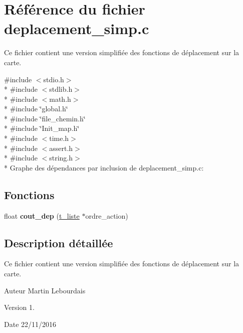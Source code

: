 \hypertarget{a00012}{}\section{Référence du fichier deplacement\+\_\+simp.\+c}
\label{a00012}


Ce fichier contient une version simplifiée des fonctions de déplacement sur la carte.  


{\ttfamily \#include $<$stdio.\+h$>$}\\*
{\ttfamily \#include $<$stdlib.\+h$>$}\\*
{\ttfamily \#include $<$math.\+h$>$}\\*
{\ttfamily \#include \char`\"{}global.\+h\char`\"{}}\\*
{\ttfamily \#include \char`\"{}file\+\_\+chemin.\+h\char`\"{}}\\*
{\ttfamily \#include \char`\"{}Init\+\_\+map.\+h\char`\"{}}\\*
{\ttfamily \#include $<$time.\+h$>$}\\*
{\ttfamily \#include $<$assert.\+h$>$}\\*
{\ttfamily \#include $<$string.\+h$>$}\\*
Graphe des dépendances par inclusion de deplacement\+\_\+simp.\+c\+:
\subsection*{Fonctions}
\begin{DoxyCompactItemize}
\item 
float {\bfseries cout\+\_\+dep} (\hyperlink{a00005}{t\+\_\+liste} $\ast$ordre\+\_\+action)\hypertarget{a00012_a7e0b3c478cc356928424d9b66c9154c4}{}\label{a00012_a7e0b3c478cc356928424d9b66c9154c4}

\end{DoxyCompactItemize}


\subsection{Description détaillée}
Ce fichier contient une version simplifiée des fonctions de déplacement sur la carte. 

\begin{DoxyAuthor}{Auteur}
Martin Lebourdais 
\end{DoxyAuthor}
\begin{DoxyVersion}{Version}
1. 
\end{DoxyVersion}
\begin{DoxyDate}{Date}
22/11/2016 
\end{DoxyDate}
